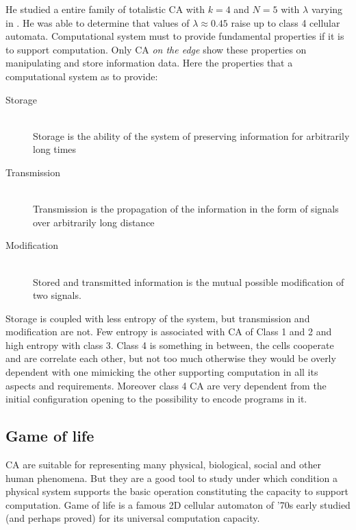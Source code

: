 He studied a entire family of totalistic CA with \begin{math}k=4
\end{math} and \begin{math}N=5\end{math} with \begin{math}\lambda\end{math}
varying in \begin{math}[0,0.75]\end{math}. He was able to determine that values
of \begin{math}\lambda\approx0.45\end{math} raise up to class 4 cellular
automata.
Computational system must to provide fundamental properties if it is
to support computation. Only CA  \emph{on the edge} show these properties on
manipulating and store information data.
Here the properties that a computational system as to provide:
\begin{description}
  \item[Storage] \hfill \\
  Storage is the ability of the system of preserving information for
arbitrarily long times
  \item[Transmission] \hfill \\
  Transmission is the propagation of the information in the
form of signals over arbitrarily long distance
  \item[Modification] \hfill \\
Stored and transmitted
information is the mutual possible modification of two signals.

\end{description}

Storage is coupled with less entropy of the system, but transmission and
modification are not. Few entropy is associated with CA of Class 1 and 2 and
high entropy with class 3. Class 4 is something in between, the cells cooperate
and are correlate each other, but not too much otherwise they would be overly
dependent with one mimicking the other supporting computation in all its aspects
and requirements. Moreover class 4 CA are very dependent from the initial
configuration opening to the possibility to encode programs in it.

\subsection{Game of life}
\label{sect:GOL}
CA are suitable for representing many physical, biological, social and other
human phenomena. But they are a good tool to study under which condition a
physical system supports the basic operation constituting the capacity to
support computation. Game of life is a famous 2D
cellular automaton of '70s early studied (and perhaps proved) for its universal
computation capacity.



